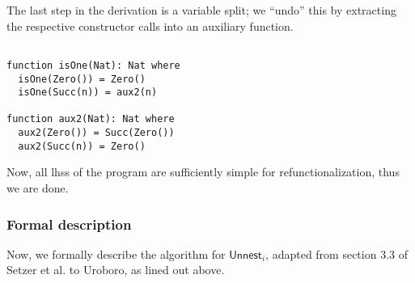 \begin{prooftree}
\end{prooftree}

The last step in the derivation is a variable split; we ``undo'' this by extracting the respective constructor calls into an auxiliary function.

\begin{lstlisting}

function isOne(Nat): Nat where
  isOne(Zero()) = Zero()
  isOne(Succ(n)) = aux2(n)

function aux2(Nat): Nat where
  aux2(Zero()) = Succ(Zero())
  aux2(Succ(n)) = Zero()

\end{lstlisting}

Now, all lhss of the program are sufficiently simple for refunctionalization, thus we are done.

\subsubsection{Formal description}

Now, we formally describe the algorithm for $\textsf{Unnest}_i$, adapted from section 3.3 of Setzer et al.\cite{setzer14unnesting} to Uroboro, as lined out above.


